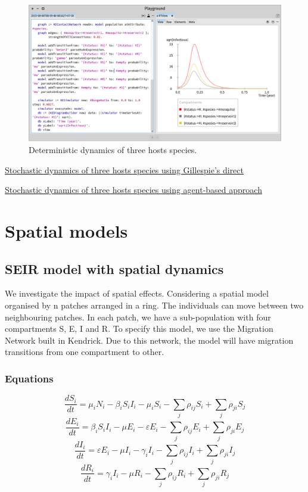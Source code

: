 \documentclass[a4paper,10pt,twoside]{book}
\begin{document}
\begin{figure}

\begin{center}
\includegraphics[width=1.0\textwidth]{figures/Multi_Host_RK4.png}\caption{Deterministic dynamics of three hosts species.\label{Multi_Host_RK4}}\end{center}
\end{figure}


\href{figures/Multi_Host_Gil}{Stochastic dynamics of three hosts species using Gillespie's direct}

\href{figures/Multi_Host_IBM}{Stochastic dynamics of three hosts species using agent-based approach}
\chapter{ Spatial models}\section{ SEIR model with spatial dynamics}
We investigate the impact of spatial effects.
Considering a spatial model organised by n patches arranged in a ring.
The individuals can move between two neighbouring patches.
In each patch, we have a sub-population with four compartments S, E, I and R.
To specify this model, we use the Migration Network built in Kendrick. Due to this network, the model will have migration transitions from one compartment to other.
\subsection{ Equations}

  \begin{equation}
    \frac{dS_i}{dt} = \mu_i N_i - \beta_i S_i I_i - \mu_i S_i - \sum_j \rho_{ij} S_i + \sum_j \rho_{ji} S_j
  \end{equation}
  \begin{equation}
    \frac{dE_i}{dt} = \beta_i S_i I_i - \mu E_i - \varepsilon E_i - \sum_j \rho_{ij} E_i + \sum_j \rho_{ji} E_j
  \end{equation}
  \begin{equation}
    \frac{dI_i}{dt} = \varepsilon E_i - \mu I_i - \gamma_i I_i - \sum_j \rho_{ij} I_i + \sum_j \rho_{ji} I_j
  \end{equation}
  \begin{equation}
    \frac{dR_i}{dt} = \gamma_i I_i - \mu R_i - \sum_j \rho_{ij} R_i + \sum_j \rho_{ji} R_j
  \end{equation}
  
\end{document}

